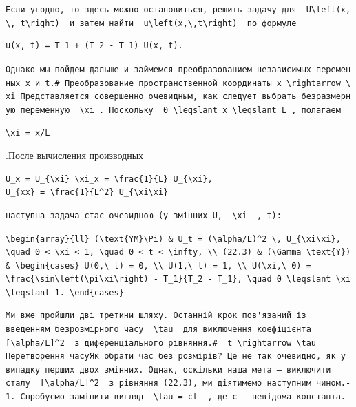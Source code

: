 \documentclass[
  ukrainian,
]{article}
\begin{document}
\texttt{Если\ угодно,\ то\ здесь\ можно\ остановиться,\ решить\ задачу\ для\ \ \textquotesingle{}U\textbackslash{}left(x,\textbackslash{},\ t\textbackslash{}right)\textquotesingle{}\ \ и\ затем\ найти\ \ \textquotesingle{}u\textbackslash{}left(x,\textbackslash{},t\textbackslash{}right)\textquotesingle{}\ \ по\ формуле}

\begin{verbatim}
u(x, t) = T_1 + (T_2 - T_1) U(x, t).
\end{verbatim}

\texttt{Однако\ мы\ пойдем\ дальше\ и\ займемся\ преобразованием\ независимых\ переменных\ x\ и\ t.\#\ Преобразование\ пространственной\ координаты\ \textquotesingle{}x\ \textbackslash{}rightarrow\ \textbackslash{}xi\textquotesingle{}\ Представляется\ совершенно\ очевидным,\ как\ следует\ выбрать\ безразмерную\ переменную\ \ \textquotesingle{}\textbackslash{}xi\textquotesingle{}\ .\ Поскольку\ \ \textquotesingle{}0\ \textbackslash{}leqslant\ x\ \textbackslash{}leqslant\ L\textquotesingle{}\ ,\ полагаем}

\begin{verbatim}
\xi = x/L
\end{verbatim}

.После вычисления производных

\begin{verbatim}
U_x = U_{\xi} \xi_x = \frac{1}{L} U_{\xi},
U_{xx} = \frac{1}{L^2} U_{\xi\xi}
\end{verbatim}

\begin{verbatim}
наступна задача стає очевидною (у змінних U,  \xi  , t):
\end{verbatim}

\begin{verbatim}
\begin{array}{ll} (\text{YM}\Pi) & U_t = (\alpha/L)^2 \, U_{\xi\xi}, \quad 0 < \xi < 1, \quad 0 < t < \infty, \\ (22.3) & (\Gamma \text{Y}) & \begin{cases} U(0,\ t) = 0, \\ U(1,\ t) = 1, \\ U(\xi,\ 0) = \frac{\sin\left(\pi\xi\right) - T_1}{T_2 - T_1}, \quad 0 \leqslant \xi \leqslant 1. \end{cases}
\end{verbatim}

\begin{verbatim}
Ми вже пройшли дві третини шляху. Останній крок пов'язаний із введенням безрозмірного часу  \tau  для виключення коефіцієнта  [\alpha/L]^2  з диференціального рівняння.#  t \rightarrow \tau  Перетворення часуЯк обрати час без розмірів? Це не так очевидно, як у випадку перших двох змінних. Однак, оскільки наша мета — виключити сталу  [\alpha/L]^2  з рівняння (22.3), ми діятимемо наступним чином.- 1. Спробуємо замінити вигляд  \tau = ct  , де c — невідома константа.
\end{verbatim}
\end{document}
